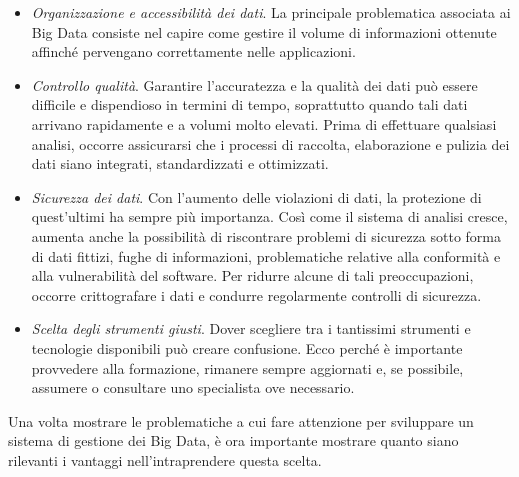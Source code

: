 \begin{itemize}
    \item \textit{Organizzazione e accessibilità dei dati}. La principale problematica associata ai Big Data consiste nel capire come gestire il volume di informazioni ottenute affinché pervengano correttamente nelle applicazioni.
    \item \textit{Controllo qualità}. Garantire l’accuratezza e la qualità dei dati può essere difficile e dispendioso in termini di tempo, soprattutto quando tali dati arrivano rapidamente e a volumi molto elevati. Prima di effettuare qualsiasi analisi, occorre assicurarsi che i processi di raccolta, elaborazione e pulizia dei dati siano integrati, standardizzati e ottimizzati.
    \item \textit{Sicurezza dei dati}. Con l’aumento delle violazioni di dati, la protezione di quest’ultimi ha sempre più importanza. Così come il sistema di analisi cresce, aumenta anche la possibilità di riscontrare problemi di sicurezza sotto forma di dati fittizi, fughe di informazioni, problematiche relative alla conformità e alla vulnerabilità del software. Per ridurre alcune di tali preoccupazioni, occorre crittografare i dati e condurre regolarmente controlli di sicurezza.
    \item \textit{Scelta degli strumenti giusti}. Dover scegliere tra i tantissimi strumenti e tecnologie disponibili può creare confusione. Ecco perché è importante provvedere alla formazione, rimanere sempre aggiornati e, se possibile, assumere o consultare uno specialista ove necessario.
\end{itemize}

Una volta mostrare le problematiche a cui fare attenzione per sviluppare un sistema di gestione dei Big Data, è ora importante mostrare quanto siano rilevanti i vantaggi nell’intraprendere questa scelta.\cite{oracle_big_data}

